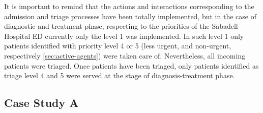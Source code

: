 \documentclass[11pt]{article} %
\begin{document}
It is important to remind that the actions and interactions corresponding
to the admission and triage processes have been totally implemented,
but in the case of diagnostic and treatment phase, respecting to the
priorities of the Sabadell Hospital ED currently only the level 1
was implemented. In such level 1 only patients identified with priority
level 4 or 5 (less urgent, and non-urgent, respectively \ref{sec:active-agents})
were taken care of. Nevertheless, all incoming patients were triaged.
Once patients have been triaged, only patients identified as triage
level 4 and 5 were served at the stage of diagnosis-treatment phase.

\subsection{Case Study A \label{sub:Case-Study-A}}
\end{document}
